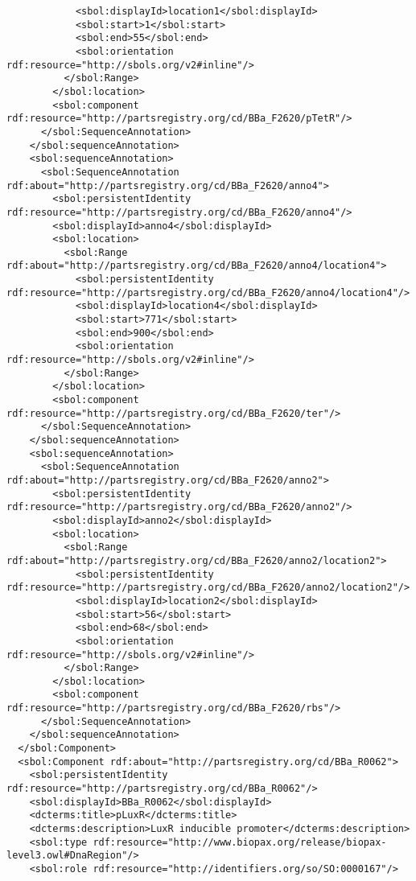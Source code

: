 \begin{lstlisting}
            <sbol:displayId>location1</sbol:displayId>
            <sbol:start>1</sbol:start>
            <sbol:end>55</sbol:end>
            <sbol:orientation rdf:resource="http://sbols.org/v2#inline"/>
          </sbol:Range>
        </sbol:location>
        <sbol:component rdf:resource="http://partsregistry.org/cd/BBa_F2620/pTetR"/>
      </sbol:SequenceAnnotation>
    </sbol:sequenceAnnotation>
    <sbol:sequenceAnnotation>
      <sbol:SequenceAnnotation rdf:about="http://partsregistry.org/cd/BBa_F2620/anno4">
        <sbol:persistentIdentity rdf:resource="http://partsregistry.org/cd/BBa_F2620/anno4"/>
        <sbol:displayId>anno4</sbol:displayId>
        <sbol:location>
          <sbol:Range rdf:about="http://partsregistry.org/cd/BBa_F2620/anno4/location4">
            <sbol:persistentIdentity rdf:resource="http://partsregistry.org/cd/BBa_F2620/anno4/location4"/>
            <sbol:displayId>location4</sbol:displayId>
            <sbol:start>771</sbol:start>
            <sbol:end>900</sbol:end>
            <sbol:orientation rdf:resource="http://sbols.org/v2#inline"/>
          </sbol:Range>
        </sbol:location>
        <sbol:component rdf:resource="http://partsregistry.org/cd/BBa_F2620/ter"/>
      </sbol:SequenceAnnotation>
    </sbol:sequenceAnnotation>
    <sbol:sequenceAnnotation>
      <sbol:SequenceAnnotation rdf:about="http://partsregistry.org/cd/BBa_F2620/anno2">
        <sbol:persistentIdentity rdf:resource="http://partsregistry.org/cd/BBa_F2620/anno2"/>
        <sbol:displayId>anno2</sbol:displayId>
        <sbol:location>
          <sbol:Range rdf:about="http://partsregistry.org/cd/BBa_F2620/anno2/location2">
            <sbol:persistentIdentity rdf:resource="http://partsregistry.org/cd/BBa_F2620/anno2/location2"/>
            <sbol:displayId>location2</sbol:displayId>
            <sbol:start>56</sbol:start>
            <sbol:end>68</sbol:end>
            <sbol:orientation rdf:resource="http://sbols.org/v2#inline"/>
          </sbol:Range>
        </sbol:location>
        <sbol:component rdf:resource="http://partsregistry.org/cd/BBa_F2620/rbs"/>
      </sbol:SequenceAnnotation>
    </sbol:sequenceAnnotation>
  </sbol:Component>
  <sbol:Component rdf:about="http://partsregistry.org/cd/BBa_R0062">
    <sbol:persistentIdentity rdf:resource="http://partsregistry.org/cd/BBa_R0062"/>
    <sbol:displayId>BBa_R0062</sbol:displayId>
    <dcterms:title>pLuxR</dcterms:title>
    <dcterms:description>LuxR inducible promoter</dcterms:description>
    <sbol:type rdf:resource="http://www.biopax.org/release/biopax-level3.owl#DnaRegion"/>
    <sbol:role rdf:resource="http://identifiers.org/so/SO:0000167"/>

\end{lstlisting}
